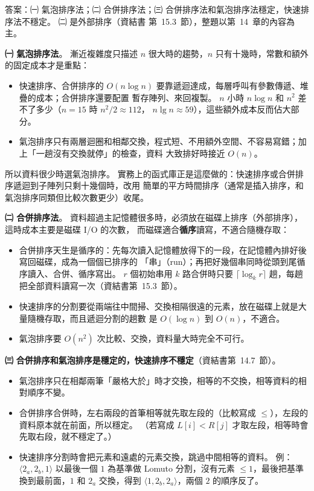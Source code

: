 \begin{pastsoln}
答案：㈠ 氣泡排序法；㈡ 合併排序法；㈢ 合併排序法和氣泡排序法穩定，快速排序法不穩定。 ㈡ 是外部排序（資結書
第~15.3~節），整題以第~14~章的內容為主。

\textbf{㈠ 氣泡排序法}。 漸近複雜度只描述 $n$ 很大時的趨勢，$n$ 只有十幾時，常數和額外的固定成本才是重點：
\begin{itemize}
\item 快速排序、合併排序的 $O(n \log n)$ 要靠遞迴達成，每層呼叫有參數傳遞、堆疊的成本；合併排序還要配置
暫存陣列、來回複製。 $n$ 小時 $n \log n$ 和 $n^2$ 差不了多少（$n = 15$ 時 $n^2/2 \approx 112$，
$n \lg n \approx 59$），這些額外成本反而佔大部分。
\item 氣泡排序只有兩層迴圈和相鄰交換，程式短、不用額外空間、不容易寫錯；加上「一趟沒有交換就停」的檢查，資料
大致排好時接近 $O(n)$。
\end{itemize}
所以資料很少時選氣泡排序。 實務上的函式庫正是這麼做的：快速排序或合併排序遞迴到子陣列只剩十幾個時，改用
簡單的平方時間排序（通常是插入排序，和氣泡排序同類但比較次數更少）收尾。

\textbf{㈡ 合併排序法}。 資料超過主記憶體很多時，必須放在磁碟上排序（外部排序），這時成本主要是磁碟 I/O 的次數，
而磁碟適合\textbf{循序}讀寫，不適合隨機存取：
\begin{itemize}
\item 合併排序天生是循序的：先每次讀入記憶體放得下的一段，在記憶體內排好後寫回磁碟，成為一個個已排序的
「串」（run）；再把好幾個串同時從頭到尾循序讀入、合併、循序寫出。 $r$ 個初始串用 $k$ 路合併時只要
$\lceil \log_k r \rceil$ 趟，每趟把全部資料讀寫一次（資結書第~15.3~節）。
\item 快速排序的分割要從兩端往中間掃、交換相隔很遠的元素，放在磁碟上就是大量隨機存取，而且遞迴分割的趟數
是 $O(\log n)$ 到 $O(n)$，不適合。
\item 氣泡排序要 $O(n^2)$ 次比較、交換，資料量大時完全不可行。
\end{itemize}

\textbf{㈢} \textbf{合併排序和氣泡排序是穩定的，快速排序不穩定}（資結書第~14.7~節）。
\begin{itemize}
\item 氣泡排序只在相鄰兩筆「嚴格大於」時才交換，相等的不交換，相等資料的相對順序不變。
\item 合併排序合併時，左右兩段的首筆相等就先取左段的（比較寫成 $\le$），左段的資料原本就在前面，所以穩定。
（若寫成 $L[i] < R[j]$ 才取左段，相等時會先取右段，就不穩定了。）
\item 快速排序分割時會把元素和遠處的元素交換，跳過中間相等的資料。 例：$\langle 2_a, 2_b, 1\rangle$ 以最後一個 $1$
為基準做 Lomuto 分割，沒有元素 $\le 1$，最後把基準換到最前面，$1$ 和 $2_a$ 交換，得到
$\langle 1, 2_b, 2_a\rangle$，兩個 $2$ 的順序反了。
\end{itemize}
\end{pastsoln}
